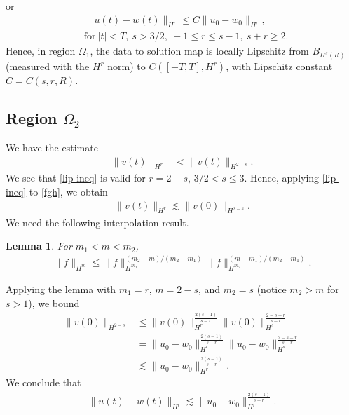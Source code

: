 \documentclass[12pt,reqno]{amsart}
\numberwithin{equation}{section}  %
\numberwithin{figure}{section}
\newtheorem{lemma}[theorem]{Lemma}
\begin{document}
%
%
or
%
%
\begin{equation}
  \label{lip-ineq}
\begin{split}
  & \| u(t) - w(t) \|_{H^{r}} \le C \| u_{0} - w_{0} \|_{H^{r}}, 
  \\
  & \text{for} \ | t | < T,
  \ s > 3/2, \ -1 \le r \le s-1, \ s + r \ge 2.
\end{split}
\end{equation}
%
Hence, in region $\Omega_{1}$, the data to solution map is locally Lipschitz from
$B_{H^{s}(R)}$ (measured with the $H^{r}$
norm) to $C([-T, T], H^{r})$, with Lipschitz constant $C = C(s, r, R)$.
%
%
%
%
%
%
%
%
%
%
\subsection{Region $\Omega_{2}$} 
\label{ssec:case-4}
%
We have the estimate
\begin{equation}
  \label{fgh}
\begin{split}
  \| v(t) \|_{H^{r}}
  & < \|v(t) \|_{H^{2-s}}.
    \end{split}
\end{equation}
%
We see that \eqref{lip-ineq} is valid for $r = 2-s$, $3/2 < s \le 3$.
Hence, applying \eqref{lip-ineq} to \eqref{fgh}, we obtain 
%
%
%
%
\begin{equation*}
\begin{split}
\| v(t) \|_{H^{r}}
 \lesssim \|v(0) \|_{H^{2-s}}.
\end{split}
\end{equation*}
%
%
%
%
%
We need the following interpolation
result. 
%
%
%
%
%
%
%
%
\begin{lemma}
  For $m_{1} < m < m_{2}$,
  \begin{equation*}
  \begin{split}
    \| f \|_{H^{m}} \le \| f \|_{H^{m_{1}}}^{(m_{2}-m)/(m_{2} - m_{1})} \| f
    \|_{H^{m_{2}}}^{(m -m_{1})/(m_{2} - m_{1})}.
  \end{split}
  \end{equation*}
\label{lem:interp}
\end{lemma}
%
Applying the lemma with $m_{1} =r$, $m = 2-s$, and $m_{2} = s$ (notice
$m_{2} > m$ for $s > 1$), we bound 
%
%
\begin{equation*}
\begin{split}
    \| v(0) \|_{H^{2-s}} 
    & \le \| v(0) \|_{H^{r}}^{\frac{2(s-1)}{s-r}} \|v(0)
  \|_{H^{s}}^{\frac{2-s-r}{s-r}}
  \\
  & = \| u_{0} - w_{0} \|_{H^{r}}^{\frac{2(s-1)}{s-r}} \|u_{0} - w_{0}
  \|_{H^{s}}^{\frac{2-s-r}{s-r}}
  \\
  & \lesssim \| u_{0} - w_{0} \|_{H^{r}}^{\frac{2(s-1)}{s-r}}.
\end{split}
\end{equation*}
%
We conclude that
%
%
\begin{equation*}
\begin{split}
  \| u(t) - w(t) \|_{H^{r}} \lesssim \|u_{0} - w_{0} \|_{H^{r}}^{\frac{2(s-1)}{s-r}}.
\end{split}
\end{equation*}
%
%
%
%
\end{document}
